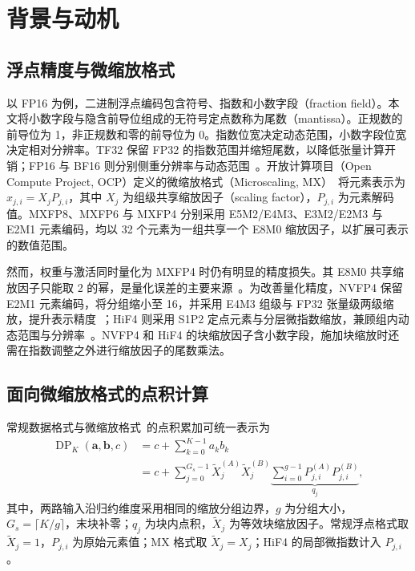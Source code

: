\section{背景与动机}
\label{sec:background}

\subsection{浮点精度与微缩放格式}
\label{sec:formats}

以 FP16 为例，二进制浮点编码包含符号、指数和小数字段（fraction field）。本文将小数字段与隐含前导位组成的无符号定点数称为尾数（mantissa）。正规数的前导位为 1，非正规数和零的前导位为 0。指数位宽决定动态范围，小数字段位宽决定相对分辨率。TF32 保留 FP32 的指数范围并缩短尾数，以降低张量计算开销；FP16 与 BF16 则分别侧重分辨率与动态范围~\cite{burgess2019bfloat16}。开放计算项目（Open Compute Project, OCP）定义的微缩放格式（Microscaling, MX）~\cite{ocpmx2023}将元素表示为 $x_{j,i}=X_jP_{j,i}$，其中 $X_j$ 为组级共享缩放因子（scaling factor），$P_{j,i}$ 为元素解码值。MXFP8、MXFP6 与 MXFP4 分别采用 E5M2/E4M3、E3M2/E2M3 与 E2M1 元素编码，均以 32 个元素为一组共享一个 E8M0 缩放因子，以扩展可表示的数值范围。

然而，权重与激活同时量化为 MXFP4 时仍有明显的精度损失。其 E8M0 共享缩放因子只能取 2 的幂，是量化误差的主要来源~\cite{egiazarian2026bridging,zhang2026benchmarking}。为改善量化精度，NVFP4 保留 E2M1 元素编码，将分组缩小至 16，并采用 E4M3 组级与 FP32 张量级两级缩放，提升表示精度~\cite{nvidia2024nvfp4}；HiF4 则采用 S1P2 定点元素与分层微指数缩放，兼顾组内动态范围与分辨率~\cite{hifloat4}。NVFP4 和 HiF4 的块缩放因子含小数字段，施加块缩放时还需在指数调整之外进行缩放因子的尾数乘法。

\subsection{面向微缩放格式的点积计算}
\label{sec:tensor_organization}

常规数据格式与微缩放格式~\cite{ocpmx2023}的点积累加可统一表示为
\begin{equation}
\begin{aligned}
\operatorname{DP}_K(\mathbf{a},\mathbf{b},c)
&=c+\sum_{k=0}^{K-1}a_kb_k \\
&=c+\sum_{j=0}^{G_s-1}
\widetilde{X}_j^{(A)}\widetilde{X}_j^{(B)}
\underbrace{\sum_{i=0}^{g-1}
P_{j,i}^{(A)}P_{j,i}^{(B)}}_{q_j},
\end{aligned}
\label{eq:blockdot}
\end{equation}
其中，两路输入沿归约维度采用相同的缩放分组边界，$g$ 为分组大小，$G_s=\lceil K/g\rceil$，末块补零；$q_j$ 为块内点积，$\widetilde{X}_j$ 为等效块缩放因子。常规浮点格式取 $\widetilde{X}_j=1$，$P_{j,i}$ 为原始元素值；MX 格式取 $\widetilde{X}_j=X_j$；HiF4 的局部微指数计入 $P_{j,i}$。

